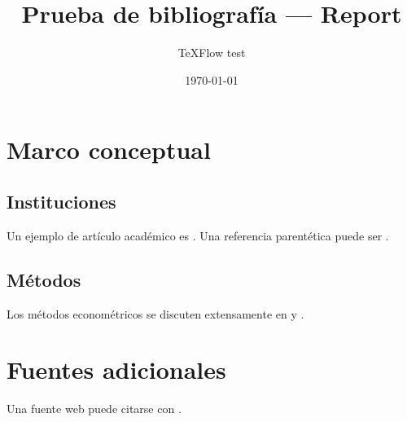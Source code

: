 \documentclass[11pt,a4paper]{report}
\title{Prueba de bibliografía — Report}
\author{TeXFlow test}
\date{\today}
\begin{document}
\maketitle
\tableofcontents

\chapter{Marco conceptual}
\section{Instituciones}
Un ejemplo de artículo académico es \textcite{acemoglu2001}.
Una referencia parentética puede ser \parencite{worldbank2024}.

\section{Métodos}
Los métodos econométricos se discuten extensamente en \textcite{angrist2009} y \textcite{heckman1979}.

\chapter{Fuentes adicionales}
Una fuente web puede citarse con \parencite{ourworld2025}.

\printbibliography[heading=bibintoc,title={Referencias}]
\end{document}
